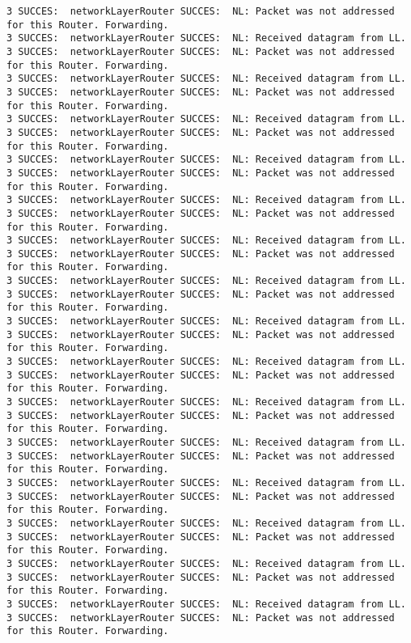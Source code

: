 \begin{lstlisting}[breaklines=true]
3 SUCCES:  networkLayerRouter SUCCES:  NL: Packet was not addressed for this Router. Forwarding.
3 SUCCES:  networkLayerRouter SUCCES:  NL: Received datagram from LL.
3 SUCCES:  networkLayerRouter SUCCES:  NL: Packet was not addressed for this Router. Forwarding.
3 SUCCES:  networkLayerRouter SUCCES:  NL: Received datagram from LL.
3 SUCCES:  networkLayerRouter SUCCES:  NL: Packet was not addressed for this Router. Forwarding.
3 SUCCES:  networkLayerRouter SUCCES:  NL: Received datagram from LL.
3 SUCCES:  networkLayerRouter SUCCES:  NL: Packet was not addressed for this Router. Forwarding.
3 SUCCES:  networkLayerRouter SUCCES:  NL: Received datagram from LL.
3 SUCCES:  networkLayerRouter SUCCES:  NL: Packet was not addressed for this Router. Forwarding.
3 SUCCES:  networkLayerRouter SUCCES:  NL: Received datagram from LL.
3 SUCCES:  networkLayerRouter SUCCES:  NL: Packet was not addressed for this Router. Forwarding.
3 SUCCES:  networkLayerRouter SUCCES:  NL: Received datagram from LL.
3 SUCCES:  networkLayerRouter SUCCES:  NL: Packet was not addressed for this Router. Forwarding.
3 SUCCES:  networkLayerRouter SUCCES:  NL: Received datagram from LL.
3 SUCCES:  networkLayerRouter SUCCES:  NL: Packet was not addressed for this Router. Forwarding.
3 SUCCES:  networkLayerRouter SUCCES:  NL: Received datagram from LL.
3 SUCCES:  networkLayerRouter SUCCES:  NL: Packet was not addressed for this Router. Forwarding.
3 SUCCES:  networkLayerRouter SUCCES:  NL: Received datagram from LL.
3 SUCCES:  networkLayerRouter SUCCES:  NL: Packet was not addressed for this Router. Forwarding.
3 SUCCES:  networkLayerRouter SUCCES:  NL: Received datagram from LL.
3 SUCCES:  networkLayerRouter SUCCES:  NL: Packet was not addressed for this Router. Forwarding.
3 SUCCES:  networkLayerRouter SUCCES:  NL: Received datagram from LL.
3 SUCCES:  networkLayerRouter SUCCES:  NL: Packet was not addressed for this Router. Forwarding.
3 SUCCES:  networkLayerRouter SUCCES:  NL: Received datagram from LL.
3 SUCCES:  networkLayerRouter SUCCES:  NL: Packet was not addressed for this Router. Forwarding.
3 SUCCES:  networkLayerRouter SUCCES:  NL: Received datagram from LL.
3 SUCCES:  networkLayerRouter SUCCES:  NL: Packet was not addressed for this Router. Forwarding.
3 SUCCES:  networkLayerRouter SUCCES:  NL: Received datagram from LL.
3 SUCCES:  networkLayerRouter SUCCES:  NL: Packet was not addressed for this Router. Forwarding.
3 SUCCES:  networkLayerRouter SUCCES:  NL: Received datagram from LL.
3 SUCCES:  networkLayerRouter SUCCES:  NL: Packet was not addressed for this Router. Forwarding.

\end{lstlisting}
